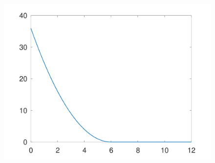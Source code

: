 \documentclass{article}
\begin{document}
\begin{figure}[!htbp]
{\begin{minipage}[b]{.23\linewidth}
    \includegraphics[scale=0.1]{figures/Assignment_G_N2_0_1.png}
    \end{minipage}
    }
\end{figure}
\end{document}
